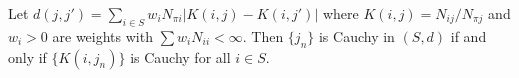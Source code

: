 Let $d(j, j') = \sum_{i \in S} w_i N_{\pi i} |K(i,j) - K(i,j')|$ where $K(i,j) = N_{ij} / N_{\pi j}$ and $w_i > 0$ are weights with $\sum w_i N_{ii} < \infty$. Then $\{j_n\}$ is Cauchy in $(S, d)$ if and only if $\{K(i, j_n)\}$ is Cauchy for all $i \in S$.
